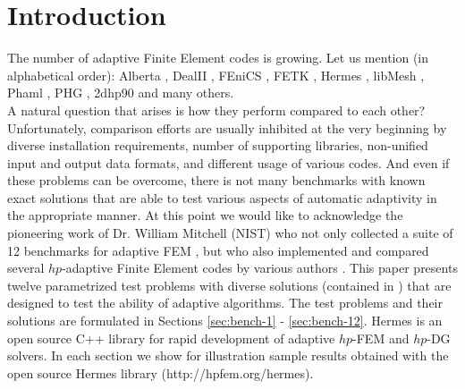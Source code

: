 \section{Introduction}
\label{sec:intro}

The number of adaptive Finite Element codes is growing.
Let us mention (in alphabetical order): Alberta
\cite{alberta}, DealII \cite{dealii}, FEniCS
\cite{fenics}, FETK \cite{fetk}, Hermes \cite{hermes}, libMesh \cite{libmesh},
Phaml \cite{phaml}, PHG \cite{phg}, 2dhp90 \cite{2dhp90} and many others.\\
A natural question that arises is how they perform compared to each other?
Unfortunately, comparison efforts are usually inhibited at the very beginning
by diverse installation requirements, number of supporting libraries, non-unified input and output data formats, and different usage of various codes. And even if these problems can be overcome, there is not many benchmarks with known exact solutions that are able to test various aspects of automatic adaptivity in the appropriate manner.
At this point we would like to acknowledge the pioneering work of Dr. William Mitchell (NIST) who not only collected a suite of 12 benchmarks for adaptive FEM \cite{mitchell-1}, but who also implemented and compared several $hp$-adaptive Finite Element codes by various authors \cite{mitchell-2}.
This paper presents twelve parametrized test problems with diverse solutions (contained in \cite{mitchell-1}) that are designed to test the ability of adaptive algorithms.
The test problems and their solutions are formulated in Sections \ref{sec:bench-1} - \ref{sec:bench-12}. 
{\sc Hermes} is an open source C++ library for rapid development of adaptive $hp$-FEM and $hp$-DG solvers.
In each section we show for illustration sample results obtained with the open
source {\sc Hermes} library (http://hpfem.org/hermes).
